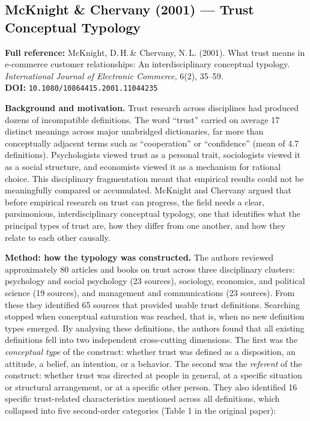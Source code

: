 \documentclass[11pt, a4paper]{article}
\begin{document}
\subsection{McKnight \& Chervany (2001) --- Trust Conceptual Typology}

\begin{infobox}
\small
\textbf{Full reference:} McKnight, D.\,H.\,\& Chervany, N.\,L. (2001). What trust means in e-commerce customer relationships: An interdisciplinary conceptual typology. \textit{International Journal of Electronic Commerce}, 6(2), 35--59.\\[4pt]
\textbf{DOI:} \texttt{10.1080/10864415.2001.11044235}
\end{infobox}

\textbf{Background and motivation.} Trust research across disciplines had produced dozens of incompatible definitions. The word ``trust'' carried on average 17 distinct meanings across major unabridged dictionaries, far more than conceptually adjacent terms such as ``cooperation'' or ``confidence'' (mean of 4.7 definitions). Psychologists viewed trust as a personal trait, sociologists viewed it as a social structure, and economists viewed it as a mechanism for rational choice. This disciplinary fragmentation meant that empirical results could not be meaningfully compared or accumulated. McKnight and Chervany argued that before empirical research on trust can progress, the field needs a clear, parsimonious, interdisciplinary conceptual typology, one that identifies what the principal types of trust are, how they differ from one another, and how they relate to each other causally.

\textbf{Method: how the typology was constructed.} The authors reviewed approximately 80 articles and books on trust across three disciplinary clusters: psychology and social psychology (23 sources), sociology, economics, and political science (19 sources), and management and communications (23 sources). From these they identified 65 sources that provided usable trust definitions. Searching stopped when conceptual saturation was reached, that is, when no new definition types emerged. By analysing these definitions, the authors found that all existing definitions fell into two independent cross-cutting dimensions. The first was the \textit{conceptual type} of the construct: whether trust was defined as a disposition, an attitude, a belief, an intention, or a behavior. The second was the \textit{referent} of the construct: whether trust was directed at people in general, at a specific situation or structural arrangement, or at a specific other person. They also identified 16 specific trust-related characteristics mentioned across all definitions, which collapsed into five second-order categories (Table 1 in the original paper):
\end{document}
